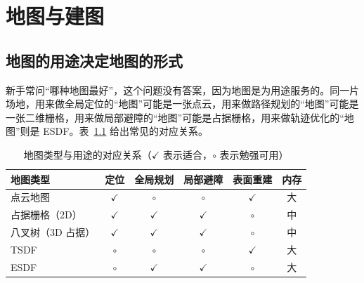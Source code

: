 \usetikzlibrary{arrows.meta, positioning}

\chapter{地图与建图}\label{ch:14-mapping}


\section{地图的用途决定地图的形式}\label{sec:14-usage}

新手常问``哪种地图最好''，这个问题没有答案，因为地图是为用途服务的。同一片场地，用来做全局定位的``地图''可能是一张点云，用来做路径规划的``地图''可能是一张二维栅格，用来做局部避障的``地图''可能是占据栅格，用来做轨迹优化的``地图''则是 ESDF。表~\ref{tab:14-map-usage} 给出常见的对应关系。

\begin{table}[htbp]
  \centering
  \caption{地图类型与用途的对应关系（$\checkmark$ 表示适合，$\circ$ 表示勉强可用）}\label{tab:14-map-usage}
  \footnotesize
  \begin{tabular}{lccccc}
    \toprule
    地图类型 & 定位 & 全局规划 & 局部避障 & 表面重建 & 内存 \\
    \midrule
    点云地图 & $\checkmark$ & $\circ$ & $\circ$ & $\checkmark$ & 大 \\
    占据栅格（2D） & $\checkmark$ & $\checkmark$ & $\checkmark$ & $\circ$ & 中 \\
    八叉树（3D 占据） & $\checkmark$ & $\checkmark$ & $\checkmark$ & $\circ$ & 中 \\
    TSDF & $\circ$ & $\circ$ & $\circ$ & $\checkmark$ & 大 \\
    ESDF & $\circ$ & $\checkmark$ & $\checkmark$ & $\circ$ & 大 \\
    \bottomrule
  \end{tabular}
\end{table}


